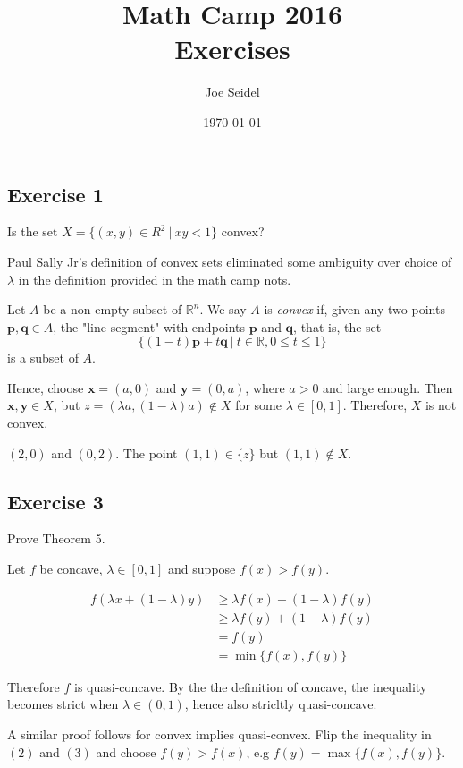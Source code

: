 \documentclass{tufte-book}
\title{Math Camp 2016\\Exercises }
\author{Joe Seidel}
\date{\today}
\newcommand{\vct}{\mathbf}
\theoremstyle{mytheoremstyle}
\theoremstyle{mylemstyle}
\theoremstyle{mydefstyle}
\begin{document}
\maketitle
{}
\newpage
{}

\subsection{Exercise 1}
Is the set $X=\{ (x,y) \in R^2 \ | \ xy <1 \}$ convex?

Paul Sally Jr's definition of convex sets eliminated some ambiguity over choice of $\lambda$ in the definition provided in the math camp nots.

 Let $A$ be a non-empty subset of $\mathbb{R}^n$.  We say $A$ is \textit{convex} if, given any two points $\vct{p},\vct{q} \in A$, the "line segment" with endpoints $\vct{p}$ and $\vct{q}$, that is, the set
\[ \{(1-t)\vct{p} + t\vct{q} \ | \ t\in\mathbb{R}, 0\leq t \leq 1 \} \]
is a subset of $A$.

Hence, choose $\vct{x} = (a, 0)$ and $\vct{y} = (0,a)$, where $a > 0$ and large enough.  Then $\vct{x}, \vct{y} \in X$, but $z = (\lambda a , (1-\lambda)a) \not\in X$ for some $\lambda \in [0,1]$.  Therefore, $X$ is not convex.

\ex $(2,0)$ and $(0,2)$.  The point $(1,1) \in \{z\}$ but $(1,1) \not\in X$.

\subsection{Exercise 3}

Prove Theorem 5.

Let $f$ be concave, $\lambda \in [0,1]$ and suppose $f(x) > f(y)$.

\begin{align}
f(\lambda x + (1-\lambda)y) &\geq \lambda f(x) + (1-\lambda)f(y) \\
&\geq \lambda f(y) + (1-\lambda)f(y)\\
&= f(y) \\
&= \min\{f(x), f(y)\}
\end{align}

Therefore $f$ is quasi-concave.  By the the definition of concave, the inequality becomes strict when $\lambda \in (0,1)$, hence also stricltly quasi-concave.

A similar proof follows for convex implies quasi-convex.  Flip the inequality in $(2)$ and $(3)$ and choose $f(y)>f(x)$, e.g $f(y) = \max\{f(x),f(y)\}$.
\end{document}
